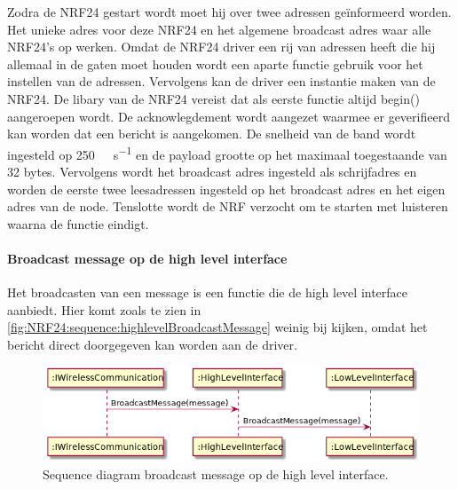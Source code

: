 \documentclass[a4paper, 11pt, oneside]{report}
\begin{document}
Zodra de NRF24 gestart wordt moet hij over twee adressen geïnformeerd worden.
Het unieke adres voor deze NRF24 en het algemene broadcast adres waar alle NRF24's op werken.
Omdat de NRF24 driver een rij van adressen heeft die hij allemaal in de gaten moet houden wordt een aparte functie gebruik voor het instellen van de adressen.
Vervolgens kan de driver een instantie maken van de NRF24.
De libary van de NRF24 vereist dat als eerste functie altijd begin() aangeroepen wordt.
De acknowlegdement wordt aangezet waarmee er geverifieerd kan worden dat een bericht is aangekomen.
De snelheid van de band wordt ingesteld op \SI{250}{\kilo\bit\per\second}  en de payload grootte op het maximaal toegestaande van 32 bytes.
Vervolgens wordt het broadcast adres ingesteld als schrijfadres en worden de eerste twee leesadressen ingesteld op het broadcast adres en het eigen adres van de node.
Tenslotte wordt de NRF verzocht om te starten met luisteren waarna de functie eindigt.

\paragraph{Broadcast message op de high level interface}
\label{DetailedDesign:NRF24:sequence:highlevelBroadcastMessage}
Het broadcasten van een message is een functie die de high level interface aanbiedt.
Hier komt zoals te zien in \autoref{fig:NRF24:sequence:highlevelBroadcastMessage} weinig bij kijken, omdat het bericht direct doorgegeven kan worden aan de driver.
\begin{figure}[H]
	\begin{center}\includegraphics[width=.7\linewidth]{UML/out/NRF24/sequence/highlevelBroadcastMessage/highlevelBroadcastMessage.png}\end{center}
	\caption{Sequence diagram broadcast message op de high level interface.}
	\label{fig:NRF24:sequence:highlevelBroadcastMessage}
\end{figure}
\end{document}
